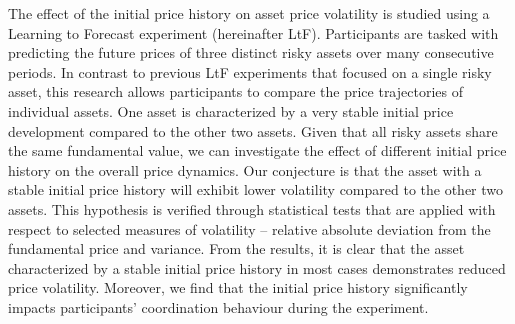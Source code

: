 
\begin{Abstrakt}
    The effect of the initial price history on asset price volatility is studied using a Learning to Forecast experiment (hereinafter LtF). Participants are tasked with predicting the future prices of three distinct risky assets over many consecutive periods. In contrast to previous LtF experiments that focused on a single risky asset, this research allows participants to compare the price trajectories of individual assets. One asset is characterized by a very stable initial price development compared to the other two assets. Given that all risky assets share the same fundamental value, we can investigate the effect of different initial price history on the overall price dynamics. Our conjecture is that the asset with a stable initial price history will exhibit lower volatility compared to the other two assets. This hypothesis is verified through statistical tests that are applied with respect to selected measures of volatility – relative absolute deviation from the fundamental price and variance. From the results, it is clear that the asset characterized by a stable initial price history in most cases demonstrates reduced price volatility. Moreover, we find that the initial price history significantly impacts participants’ coordination behaviour during the experiment.
\end{Abstrakt}



\clearpage